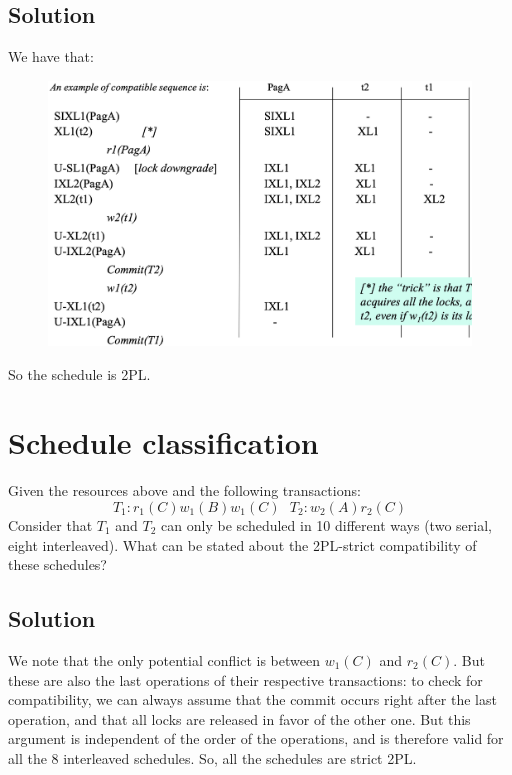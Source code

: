\documentclass[12pt, a4paper]{report}
\newtheorem[style=M,bodystyle=\normalfont]{theorem}{Theorem}
\newtheorem[style=M,bodystyle=\normalfont]{corollary}{Corollary}
\newtheorem[style=M,bodystyle=\normalfont]{lemma}{Lemma}
\newtheorem[style=M,bodystyle=\normalfont]{definition}{Definition}
\begin{document}
    \subsection*{Solution}
        We have that: 
        \begin{figure}[H]
            \centering
            \includegraphics[width=1\linewidth]{images/HLsol1.png}
        \end{figure}
        So the schedule is 2PL.

    \newpage

    \section{Schedule classification}
        Given the resources above and the following transactions:
        \[T_1: r_1(C) w_1(B) w_1(C) \:\:\: T_2: w_2(A) r_2(C)\]
        Consider that $T_1$ and $T_2$ can only be scheduled in 10 different ways (two serial, eight interleaved). What can be stated about 
        the 2PL-strict compatibility of these schedules? 
    \subsection*{Solution}
        We note that the only potential conflict is between $w_1(C)$ and $r_2(C)$. But these are also the last operations of their respective 
        transactions: to check for compatibility, we can always assume that the commit occurs right after the last operation, and that all 
        locks are released in favor of the other one. But this argument is independent of the order of the operations, and is therefore valid 
        for all the 8 interleaved schedules. So, all the schedules are strict 2PL. 
\end{document}
